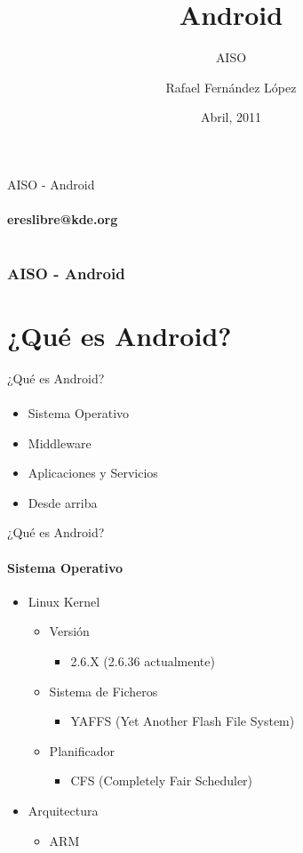 \documentclass[12pt]{beamer}
\title{Android}
\subtitle{AISO}
\author{Rafael Fernández López}
\date{Abril, 2011}
\begin{document}
\begin{frame}{AISO - Android}
  \framesubtitle{ereslibre@kde.org}
  \titlepage
\end{frame}

\section*{}
\begin{frame}
  \frametitle{AISO - Android}
  \tableofcontents[section=1,hidesubsections]
\end{frame}


\section{¿Qué es Android?}

\begin{frame}{¿Qué es Android?}
    \framesubtitle{}
    \begin{itemize}
        \item Sistema Operativo
        \item Middleware
        \item Aplicaciones y Servicios
        \item Desde arriba
    \end{itemize}
\end{frame}

\begin{frame}{¿Qué es Android?}
    \framesubtitle{Sistema Operativo}
    \begin{itemize}
        \item Linux Kernel
        \begin{itemize}
            \item Versión
            \begin{itemize}
                \item 2.6.X (2.6.36 actualmente)
            \end{itemize}
            \item Sistema de Ficheros
            \begin{itemize}
                \item YAFFS (Yet Another Flash File System)
            \end{itemize}
            \item Planificador
            \begin{itemize}
                \item CFS (Completely Fair Scheduler)
            \end{itemize}
        \end{itemize}
        \bigskip
        \item Arquitectura
        \begin{itemize}
            \item ARM
        \end{itemize}
    \end{itemize}
\end{frame}
\end{document}
